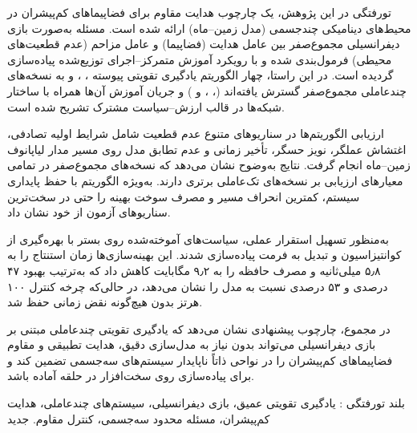 

\pagestyle{plain}

\begin{وسط‌چین}
\end{وسط‌چین}

‌تورفتگی 
در این پژوهش، یک چارچوب هدایت مقاوم برای فضاپیماهای کم‌پیشران در محیط‌های دینامیکی چندجسمی (مدل  زمین–ماه) ارائه شده است. مسئله به‌صورت بازی دیفرانسیلی مجموع‌صفر بین عامل هدایت (فضاپیما) و عامل مزاحم (عدم قطعیت‌های محیطی) فرمول‌بندی شده و با رویکرد آموزش متمرکز–اجرای توزیع‌شده پیاده‌سازی گردیده است. در این راستا، چهار الگوریتم یادگیری تقویتی پیوسته ، ،  و  به نسخه‌های چندعاملی مجموع‌صفر گسترش یافته‌اند (، ،  و ) و جریان آموزش آن‌ها همراه با ساختار شبکه‌ها در قالب ارزش–سیاست مشترک تشریح شده است.

ارزیابی الگوریتم‌ها در سناریوهای متنوع عدم قطعیت شامل شرایط اولیه تصادفی، اغتشاش عملگر، نویز حسگر، تأخیر زمانی و عدم تطابق مدل روی مسیر مدار لیاپانوف زمین–ماه انجام گرفت. نتایج به‌وضوح نشان می‌دهد که نسخه‌های مجموع‌صفر در تمامی معیارهای ارزیابی بر نسخه‌های تک‌عاملی برتری دارند. به‌ویژه الگوریتم  با حفظ پایداری سیستم، کمترین انحراف مسیر و مصرف سوخت بهینه را حتی در سخت‌ترین سناریوهای آزمون از خود نشان داد.

به‌منظور تسهیل استقرار عملی، سیاست‌های آموخته‌شده روی بستر  با بهره‌گیری از کوانتیزاسیون  و تبدیل به فرمت  پیاده‌سازی شدند. این بهینه‌سازی‌ها زمان استنتاج را به ۵٫۸ میلی‌ثانیه و مصرف حافظه را به ۹٫۲ مگابایت کاهش داد که به‌ترتیب بهبود ۴۷ درصدی و ۵۳ درصدی نسبت به مدل  را نشان می‌دهد، در حالی‌که چرخه کنترل ۱۰۰ هرتز بدون هیچ‌گونه نقض زمانی حفظ شد.

در مجموع، چارچوب پیشنهادی نشان می‌دهد که یادگیری تقویتی چندعاملی مبتنی بر بازی دیفرانسیلی می‌تواند بدون نیاز به مدل‌سازی دقیق، هدایت تطبیقی و مقاوم فضاپیماهای کم‌پیشران را در نواحی ذاتاً ناپایدار سیستم‌های سه‌جسمی تضمین کند و برای پیاده‌سازی روی سخت‌افزار در حلقه آماده باشد.


‌بلند
‌تورفتگی : 
 یادگیری تقویتی عمیق، بازی دیفرانسیلی، سیستم‌های چندعاملی، هدایت کم‌پیشران، مسئله محدود سه‌جسمی، کنترل مقاوم.
‌جدید
